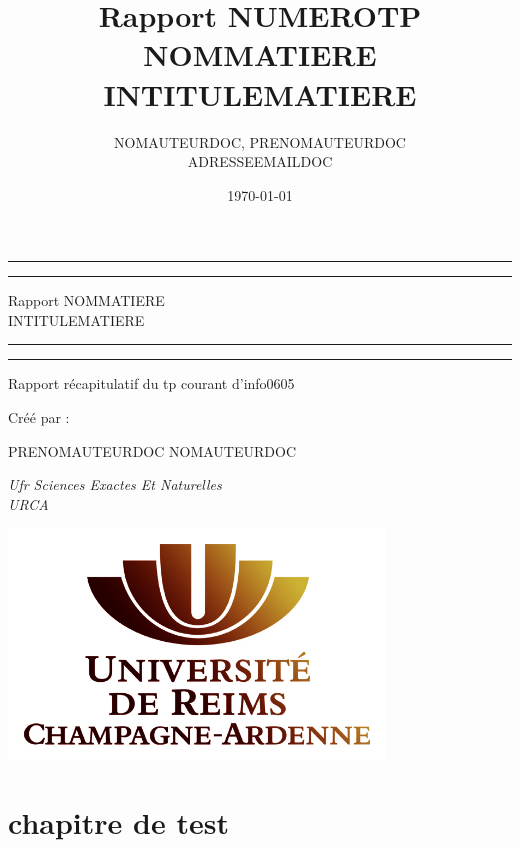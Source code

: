 \documentclass[12pt]{report}
\title{\textbf{Rapport NUMEROTP NOMMATIERE\\
INTITULEMATIERE}}
\author{
	NOMAUTEURDOC, PRENOMAUTEURDOC\\
	{\small {ADRESSEEMAILDOC}}
}
\date{\today}
\begin{document}
	
	\begin{titlepage}

	\centering
	
	\scshape
	
	\vspace*{\baselineskip}

	\rule{\textwidth}{2pt}\vspace*{-\baselineskip}\vspace*{2pt} 
	\rule{\textwidth}{0.5pt}
	
	\vspace{0.75\baselineskip}
	
	{\LARGE Rapport NOMMATIERE\\ INTITULEMATIERE\\}
	
	\vspace{0.75\baselineskip}
	
	\rule{\textwidth}{0.5pt}\vspace*{-\baselineskip}\vspace{3pt} 
	\rule{\textwidth}{2pt} 
	
	\vspace{1.5\baselineskip} 
	
	Rapport récapitulatif du tp courant d'info0605
	
	\vspace*{3\baselineskip}
	
	Créé par :
	
	\vspace{0.5\baselineskip}
	{\scshape\Large PRENOMAUTEURDOC NOMAUTEURDOC}
	
	\vspace{0.5\baselineskip}
	
	\textit{Ufr Sciences Exactes Et Naturelles \\ URCA }
	
	\vfill
	
	\includegraphics[width=10cm]{images/urca.jpg}
	
	\vspace{0.5\baselineskip}
	
	\textbf{{\large \the\year}}

	\end{titlepage}
	
	\maketitle
	
	\tableofcontents

	\chapter{chapitre de test}
		
	
\end{document}
